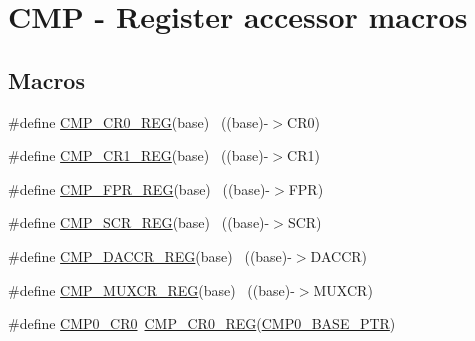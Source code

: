 \hypertarget{group___c_m_p___register___accessor___macros}{}\section{C\+MP -\/ Register accessor macros}
\label{group___c_m_p___register___accessor___macros}
\subsection*{Macros}
\begin{DoxyCompactItemize}
\item 
\#define \hyperlink{group___c_m_p___register___accessor___macros_gade821ad13c2c460c33f1c0929cc904c3}{C\+M\+P\+\_\+\+C\+R0\+\_\+\+R\+EG}(base)                                            ~((base)-\/$>$C\+R0)
\item 
\#define \hyperlink{group___c_m_p___register___accessor___macros_ga2f761d7412507e4415f230a5e4d972a2}{C\+M\+P\+\_\+\+C\+R1\+\_\+\+R\+EG}(base)                                            ~((base)-\/$>$C\+R1)
\item 
\#define \hyperlink{group___c_m_p___register___accessor___macros_ga343773a1ef97ce5124a805a7e42af104}{C\+M\+P\+\_\+\+F\+P\+R\+\_\+\+R\+EG}(base)                                            ~((base)-\/$>$F\+PR)
\item 
\#define \hyperlink{group___c_m_p___register___accessor___macros_ga078b884bead12ed9b24c285c8f73fd27}{C\+M\+P\+\_\+\+S\+C\+R\+\_\+\+R\+EG}(base)                                            ~((base)-\/$>$S\+CR)
\item 
\#define \hyperlink{group___c_m_p___register___accessor___macros_ga241a18e5c046627c53ba30229a1a313c}{C\+M\+P\+\_\+\+D\+A\+C\+C\+R\+\_\+\+R\+EG}(base)                                        ~((base)-\/$>$D\+A\+C\+CR)
\item 
\#define \hyperlink{group___c_m_p___register___accessor___macros_ga61de65bd4b7dc63f96d8c361be243a08}{C\+M\+P\+\_\+\+M\+U\+X\+C\+R\+\_\+\+R\+EG}(base)                                        ~((base)-\/$>$M\+U\+X\+CR)
\item 
\#define \hyperlink{group___c_m_p___register___accessor___macros_ga0b4ea995265b027fb308b236b2f0afd4}{C\+M\+P0\+\_\+\+C\+R0}~\hyperlink{group___c_m_p___register___accessor___macros_gade821ad13c2c460c33f1c0929cc904c3}{C\+M\+P\+\_\+\+C\+R0\+\_\+\+R\+EG}(\hyperlink{group___c_m_p___peripheral_ga5a7a6b1d0743a05435ba5cb2dc2b3431}{C\+M\+P0\+\_\+\+B\+A\+S\+E\+\_\+\+P\+TR})

\end{DoxyCompactItemize}

